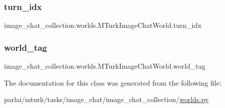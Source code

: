 \subsubsection{\texorpdfstring{turn\+\_\+idx}{turn\_idx}}
{\footnotesize\ttfamily image\+\_\+chat\+\_\+collection.\+worlds.\+M\+Turk\+Image\+Chat\+World.\+turn\+\_\+idx}

\mbox{\label{classimage__chat__collection_1_1worlds_1_1MTurkImageChatWorld_a0be08870bfc570382e035bc0b6119b62}} 
\subsubsection{\texorpdfstring{world\+\_\+tag}{world\_tag}}
{\footnotesize\ttfamily image\+\_\+chat\+\_\+collection.\+worlds.\+M\+Turk\+Image\+Chat\+World.\+world\+\_\+tag}



The documentation for this class was generated from the following file\+:\begin{DoxyCompactItemize}
\item 
parlai/mturk/tasks/image\+\_\+chat/image\+\_\+chat\+\_\+collection/\hyperlink{parlai_2mturk_2tasks_2image__chat_2image__chat__collection_2worlds_8py}{worlds.\+py}\end{DoxyCompactItemize}
